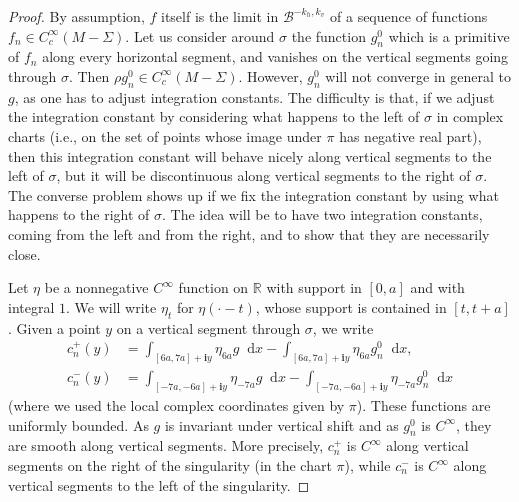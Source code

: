 \documentclass[11pt, a4paper, oneside, final, pagebackref]{amsart}
\newcommand{\boB}{\mathcal{B}}
\newcommand{\R}{\mathbb{R}}
\newcommand{\dd}{\mathop{}\!\mathrm{d}}
\newcommand{\ic}{\mathbf{i}}
\theoremstyle{definition}
\numberwithin{equation}{section}
\begin{document}
\begin{proof}
By assumption, $f$ itself is the limit in $\boB^{-k_h, k_v}$ of a sequence of
functions $f_n \in C^\infty_c(M-\Sigma)$. Let us consider around $\sigma$ the
function $g^0_n$ which is a primitive of $f_n$ along every horizontal
segment, and vanishes on the vertical segments going through $\sigma$. Then
$\rho g^0_n \in C^\infty_c(M-\Sigma)$. However, $g_n^0$ will not converge in
general to $g$, as one has to adjust integration constants. The difficulty is
that, if we adjust the integration constant by considering what happens to
the left of $\sigma$ in complex charts (i.e., on the set of points whose
image under $\pi$ has negative real part), then this integration constant
will behave nicely along vertical segments to the left of $\sigma$, but it
will be discontinuous along vertical segments to the right of $\sigma$. The
converse problem shows up if we fix the integration constant by using what
happens to the right of $\sigma$. The idea will be to have two integration
constants, coming from the left and from the right, and to show that they are
necessarily close.

Let $\eta$ be a nonnegative $C^\infty$ function on $\R$ with support in
$[0,a]$ and with integral $1$. We will write $\eta_t$ for $\eta(\cdot -t)$,
whose support is contained in $[t, t+a]$. Given a point $y$ on a vertical
segment through $\sigma$, we write
\begin{align*}
  c_n^+(y) & = \int_{[6a, 7a] + \ic y} \eta_{6a} g \dd x
             - \int_{[6a, 7a] + \ic y} \eta_{6a} g^0_n \dd x,
  \\
  c_n^-(y) & = \int_{[-7a, -6a] + \ic y} \eta_{-7a} g \dd x
             - \int_{[-7a, -6a] + \ic y} \eta_{-7a} g^0_n \dd x
\end{align*}
(where we used the local complex coordinates given by $\pi$). These functions
are uniformly bounded. As $g$ is invariant under vertical shift and as
$g^0_n$ is $C^\infty$, they are smooth along vertical segments. More
precisely, $c_n^+$ is $C^\infty$ along vertical segments on the right of the
singularity (in the chart $\pi$), while $c_n^-$ is $C^\infty$ along vertical
segments to the left of the singularity.


\end{proof}
\end{document}

